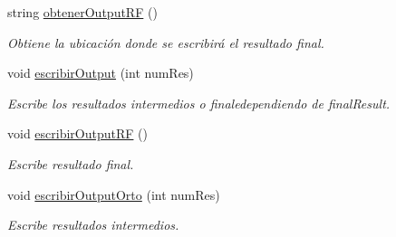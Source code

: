 \begin{DoxyCompactItemize}
string \mbox{\hyperlink{classuav_1_1Stitcher_a5f6f8f09c80f39daf9f2ea34e0db91b9}{obtener\+Output\+RF}} ()
\begin{DoxyCompactList}\small\item\em Obtiene la ubicación donde se escribirá el resultado final. \end{DoxyCompactList}\item 
void \mbox{\hyperlink{classuav_1_1Stitcher_a079c00542221b0e2fc551d2e97df7b97}{escribir\+Output}} (int num\+Res)
\begin{DoxyCompactList}\small\item\em Escribe los resultados intermedios o finaledependiendo de final\+Result. \end{DoxyCompactList}\item 
\mbox{\label{classuav_1_1Stitcher_aedccb071e6ee13405e842c0764a08ecd}} 
void \mbox{\hyperlink{classuav_1_1Stitcher_aedccb071e6ee13405e842c0764a08ecd}{escribir\+Output\+RF}} ()
\begin{DoxyCompactList}\small\item\em Escribe resultado final. \end{DoxyCompactList}\item 
void \mbox{\hyperlink{classuav_1_1Stitcher_aa3ed2d63f08d787b3b78ec4445195b2b}{escribir\+Output\+Orto}} (int num\+Res)
\begin{DoxyCompactList}\small\item\em Escribe resultados intermedios. \end{DoxyCompactList}\end{DoxyCompactItemize}
